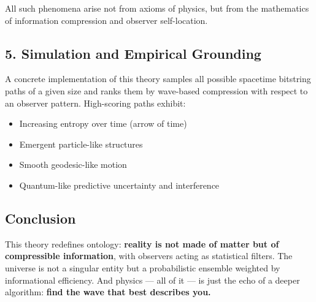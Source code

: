 \documentclass[11pt]{article}
\begin{document}
All such phenomena arise not from axioms of physics, but from the mathematics of information compression and observer self-location.

\subsection*{5. Simulation and Empirical Grounding}

A concrete implementation of this theory samples all possible spacetime bitstring paths of a given size and ranks them by wave-based compression with respect to an observer pattern. High-scoring paths exhibit:

\begin{itemize}
      \item Increasing entropy over time (arrow of time)
      \item Emergent particle-like structures
      \item Smooth geodesic-like motion
      \item Quantum-like predictive uncertainty and interference
\end{itemize}


\subsection*{Conclusion}

This theory redefines ontology: \textbf{reality is not made of matter but of compressible information}, with observers acting as statistical filters. The universe is not a singular entity but a probabilistic ensemble weighted by informational efficiency. And physics — all of it — is just the echo of a deeper algorithm: \textbf{find the wave that best describes you.}
\end{document}
